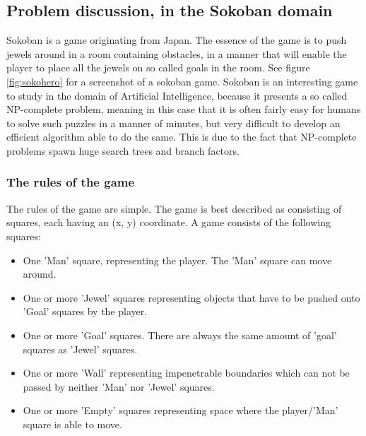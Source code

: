 \subsection{Problem discussion, in the Sokoban domain}
Sokoban is a game originating from Japan. The essence of the game is to push jewels around in a room containing obstacles, in a manner that will enable the player to place all the jewels on so called goals in the room. See figure \ref{fig:sokohero} for a screenshot of a sokoban game.
Sokoban is an interesting game to study in the domain of Artificial Intelligence, because it presents a so called NP-complete problem, meaning in this case that it is often fairly easy for humans to solve such puzzles in a manner of minutes, but very difficult to develop an efficient algorithm able to do the same. This is due to the fact that NP-complete problems spawn huge search trees and branch factors.

\subsubsection{The rules of the game}
The rules of the game are simple. The game is best described as consisting of squares, each having an (x, y) coordinate. A game consists of the following squares:
\begin{itemize}
\item One 'Man' square, representing the player. The 'Man' square can move around.
\item One or more 'Jewel' squares representing objects that have to be pushed onto 'Goal' squares by the player.
\item One or more 'Goal' squares. There are always the same amount of 'goal' squares as 'Jewel' squares.
\item One or more 'Wall' representing impenetrable boundaries which can not be passed by neither 'Man' nor 'Jewel' squares.
\item One or more 'Empty' squares representing space where the player/'Man' square is able to move. 
\end{itemize}

